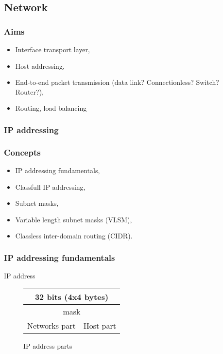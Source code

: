   \subsection{Network}
  \begin{frame}
    \frametitle{Aims}
      \begin{itemize}
        \item Interface transport layer,\pause
	\item Host addressing,\pause
        \item End-to-end packet transmission (data link? Connectionless? Switch? Router?),\pause
        \item Routing, load balancing
      \end{itemize}
  \end{frame}
  \subsubsection{IP addressing}
  \begin{frame}
    \frametitle{Concepts}
      \begin{itemize}
        \item IP addressing fundamentals,\pause
        \item Classfull IP addressing,\pause
        \item Subnet masks,\pause
        \item Variable length subnet masks (VLSM),\pause
        \item Classless inter-domain routing (CIDR).
      \end{itemize}
  \end{frame}

  \begin{frame}
    \frametitle{IP addressing fundamentals}
    \begin{block}{IP address}
      \begin{figure}
        \centering
        \begin{tabular}{|c|c|}
          \multicolumn{2}{c}{32 bits (4x4 bytes)} \\ \hline
           \multicolumn{2}{|c|}{\color{brown}mask} \\ \hline
          \color{brown}Networks part & \color{blue}Host part \\ \hline
        \end{tabular}
        \caption{IP address parts}
        \label{fig:inside_ip_address}
      \end{figure}
    \end{block}
  \end{frame}

